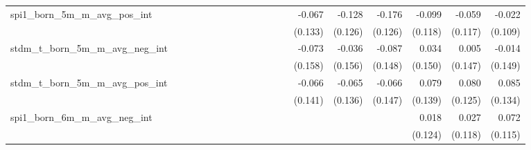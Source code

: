 \begin{tabular}{lrrrrrrrrrrrrrrrrrr}
spi1\_born\_5m\_m\_avg\_pos\_int            &             &             &             &             &             &             &             &             &             &             &             &             &      -0.067 &      -0.128 &      -0.176 &      -0.099 &      -0.059 &      -0.022 \\ 
                                            &             &             &             &             &             &             &             &             &             &             &             &             &     (0.133) &     (0.126) &     (0.126) &     (0.118) &     (0.117) &     (0.109) \\ 
stdm\_t\_born\_5m\_m\_avg\_neg\_int         &             &             &             &             &             &             &             &             &             &             &             &             &      -0.073 &      -0.036 &      -0.087 &       0.034 &       0.005 &      -0.014 \\ 
                                            &             &             &             &             &             &             &             &             &             &             &             &             &     (0.158) &     (0.156) &     (0.148) &     (0.150) &     (0.147) &     (0.149) \\ 
stdm\_t\_born\_5m\_m\_avg\_pos\_int         &             &             &             &             &             &             &             &             &             &             &             &             &      -0.066 &      -0.065 &      -0.066 &       0.079 &       0.080 &       0.085 \\ 
                                            &             &             &             &             &             &             &             &             &             &             &             &             &     (0.141) &     (0.136) &     (0.147) &     (0.139) &     (0.125) &     (0.134) \\ 
spi1\_born\_6m\_m\_avg\_neg\_int            &             &             &             &             &             &             &             &             &             &             &             &             &             &             &             &       0.018 &       0.027 &       0.072 \\ 
                                            &             &             &             &             &             &             &             &             &             &             &             &             &             &             &             &     (0.124) &     (0.118) &     (0.115) \\ 

\end{tabular}
